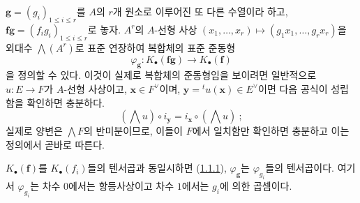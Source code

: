 \begin{env}[1.1.5]
\label{III.1.1.5-fr}
$\mathbf g=(g_i)_{1\leq i\leq r}$를 $A$의 $r$개 원소로 이루어진 또 다른
수열이라 하고, $\mathbf f\mathbf g=(f_ig_i)_{1\leq i\leq r}$로 놓자.
$A^r$의 $A$-선형 사상
$(x_1,\ldots,x_r)\mapsto(g_1x_1,\ldots,g_rx_r)$을 외대수
$\bigwedge(A^r)$로 표준 연장하여 복합체의 표준 준동형
\begin{equation}
\label{III.1.1.5.1-fr}
\tag{1.1.5.1}
\varphi_{\mathbf g}:K_\bullet(\mathbf f\mathbf g)\longrightarrow
K_\bullet(\mathbf f)
\end{equation}
을 정의할 수 있다. 이것이 실제로 복합체의 준동형임을 보이려면 일반적으로
$u:E\to F$가 $A$-선형 사상이고, $\mathbf x\in F^\vee$이며,
$\mathbf y={}^tu(\mathbf x)\in E^\vee$이면 다음 공식이 성립함을 확인하면
충분하다.
\begin{equation}
\label{III.1.1.5.2-fr}
\tag{1.1.5.2}
(\bigwedge u)\circ i_{\mathbf y}=i_{\mathbf x}\circ(\bigwedge u)~;
\end{equation}
실제로 양변은 $\bigwedge F$의 반미분이므로, 이들이 $F$에서 일치함만
확인하면 충분하고 이는 정의에서 곧바로 따른다.

$K_\bullet(\mathbf f)$를 $K_\bullet(f_i)$들의 텐서곱과 동일시하면
(\hyperref[III.1.1.1-fr]{1.1.1}), $\varphi_{\mathbf g}$는
$\varphi_{g_i}$들의 텐서곱이다. 여기서 $\varphi_{g_i}$는 차수 $0$에서는
항등사상이고 차수 $1$에서는 $g_i$에 의한 곱셈이다.
\end{env}

